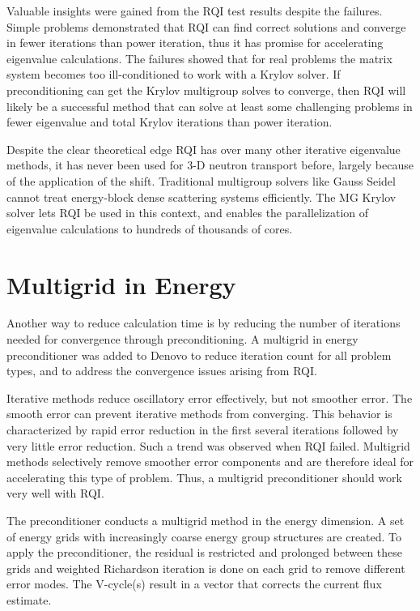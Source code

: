 Valuable insights were gained from the RQI test results despite the failures. Simple problems demonstrated that RQI can find correct solutions and converge in fewer iterations than power iteration, thus it has promise for accelerating eigenvalue calculations. The failures showed that for real problems the matrix system becomes too ill-conditioned to work with a Krylov solver. If preconditioning can get the Krylov multigroup solves to converge, then RQI will likely be a successful method that can solve at least some challenging problems in fewer eigenvalue and total Krylov iterations than power iteration. 

Despite the clear theoretical edge RQI has over many other iterative eigenvalue methods, it has never been used for 3-D neutron transport before, largely because of the application of the shift. Traditional multigroup solvers like Gauss Seidel cannot treat energy-block dense scattering systems efficiently. The MG Krylov solver lets RQI be used in this context, and enables the parallelization of eigenvalue calculations to hundreds of thousands of cores. 

\section{Multigrid in Energy}
Another way to reduce calculation time is by reducing the number of iterations needed for convergence through preconditioning. %
A multigrid in energy preconditioner was added to Denovo to reduce iteration count for all problem types, and to address the convergence issues arising from RQI. 

Iterative methods reduce oscillatory error effectively, but not smoother error. The smooth error can prevent iterative methods from converging. This behavior is characterized by rapid error reduction in the first several iterations followed by very little error reduction. Such a trend was observed when RQI failed. Multigrid methods selectively remove smoother error components and are therefore ideal for accelerating this type of problem. Thus, a multigrid preconditioner should work very well with RQI. 

The  preconditioner conducts a multigrid method in the energy dimension. A set of energy grids with increasingly coarse energy group structures are created. To apply the preconditioner, the residual is restricted and prolonged between these grids and weighted Richardson iteration is done on each grid to remove different error modes. The V-cycle(s) result in a vector that corrects the current flux estimate. 

